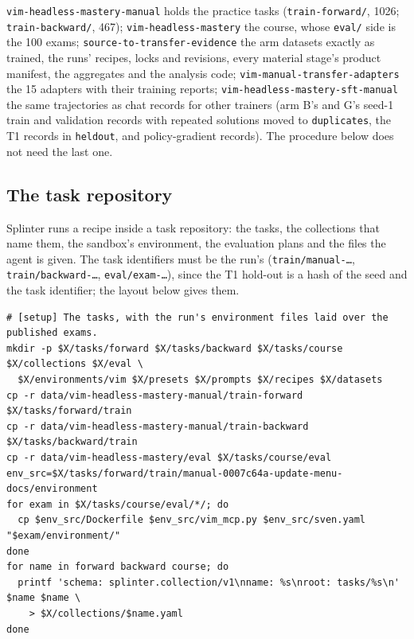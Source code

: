 \begin{sloppypar}
\nolinkurl{vim-headless-mastery-manual} holds the practice tasks (\nolinkurl{train-forward/}, 1026; \nolinkurl{train-backward/}, 467);
\nolinkurl{vim-headless-mastery} the course, whose \nolinkurl{eval/} side is the 100 exams; \nolinkurl{source-to-transfer-evidence} the
arm datasets exactly as trained, the runs' recipes, locks and revisions, every material stage's product manifest, the aggregates
and the analysis code; \nolinkurl{vim-manual-transfer-adapters} the 15 adapters with their training reports;
\nolinkurl{vim-headless-mastery-sft-manual} the same trajectories as chat records for other trainers (arm B's and G's seed-1 train
and validation records with repeated solutions moved to \nolinkurl{duplicates}, the T1 records in \nolinkurl{heldout}, and
policy-gradient records). The procedure below does not need the last one.
\end{sloppypar}

\subsection{The task repository}\label{app:repro-vim-repo}

\begin{sloppypar}
Splinter runs a recipe inside a task repository: the tasks, the collections that name them, the sandbox's environment, the
evaluation plans and the files the agent is given. The task identifiers must be the run's (\texttt{train/manual-\ldots},
\texttt{train/backward-\ldots}, \texttt{eval/exam-\ldots}), since the T1 hold-out is a hash of the seed and the task identifier;
the layout below gives them.
\end{sloppypar}

{\scriptsize
\begin{verbatim}
# [setup] The tasks, with the run's environment files laid over the published exams.
mkdir -p $X/tasks/forward $X/tasks/backward $X/tasks/course $X/collections $X/eval \
  $X/environments/vim $X/presets $X/prompts $X/recipes $X/datasets
cp -r data/vim-headless-mastery-manual/train-forward $X/tasks/forward/train
cp -r data/vim-headless-mastery-manual/train-backward $X/tasks/backward/train
cp -r data/vim-headless-mastery/eval $X/tasks/course/eval
env_src=$X/tasks/forward/train/manual-0007c64a-update-menu-docs/environment
for exam in $X/tasks/course/eval/*/; do
  cp $env_src/Dockerfile $env_src/vim_mcp.py $env_src/sven.yaml "$exam/environment/"
done
for name in forward backward course; do
  printf 'schema: splinter.collection/v1\nname: %s\nroot: tasks/%s\n' $name $name \
    > $X/collections/$name.yaml
done
\end{verbatim}
}

